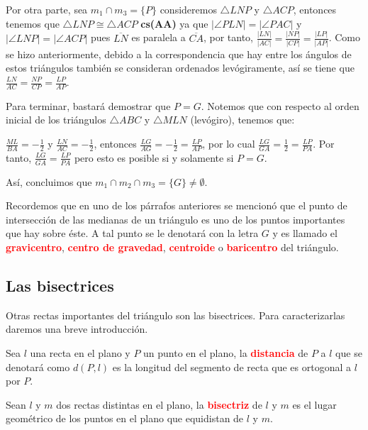 \begin{dem}
Por otra parte, sea $m_{1}\cap m_{3}=\{P\}$ consideremos $\triangle LNP$ y $\triangle ACP$, entonces tenemos que $\triangle LNP\cong\triangle ACP$ \textbf{cs(AA)} ya que $|\angle PLN|=|\angle PAC|$ y $|\angle LNP|=|\angle ACP|$ pues $\overline{LN}$ es paralela a $\overline{CA}$, por tanto, $\frac{|LN|}{|AC|}=\frac{|NP|}{|CP|}=\frac{|LP|}{|AP|}$. Como se hizo anteriormente, debido a la correspondencia que hay entre los ángulos de estos triángulos también se consideran ordenados levógiramente, así se tiene que $\frac{LN}{AC}=\frac{NP}{CP}=\frac{LP}{AP}$.

Para terminar, bastará demostrar que $P=G$. Notemos que con respecto al orden inicial de los triángulos $\triangle ABC$ y $\triangle MLN$ (levógiro), tenemos que:

$\frac{ML}{BA}=-\frac{1}{2}$ y $\frac{LN}{AC}=-\frac{1}{2}$, entonces $\frac{LG}{AG}=-\frac{1}{2}=\frac{LP}{AP}$, por lo cual $\frac{LG}{GA}=\frac{1}{2}=\frac{LP}{PA}$. Por tanto, $\frac{LG}{GA}=\frac{LP}{PA}$ pero esto es posible si y solamente si $P=G$.

Así, concluimos que $m_{1}\cap m_{2}\cap m_{3}=\{G\}\neq\emptyset.$
\end{dem}

Recordemos que en uno de los párrafos anteriores se mencionó que el punto de intersección de las medianas de un triángulo es uno de los puntos importantes que hay sobre éste. A tal punto se le denotará con la letra $G$ y es llamado el \textcolor{red}{\bf gravicentro}, \textcolor{red}{\bf centro de gravedad}, \textcolor{red}{\bf centroide} o \textcolor{red}{\bf baricentro} del triángulo.

\subsection{Las bisectrices}
Otras rectas importantes del triángulo son las bisectrices. Para caracterizarlas daremos una breve introducción. 

\begin{df}
Sea $l$ una recta en el plano y $P$ un punto en el plano, la \textcolor{red}{\bf distancia} de $P$ a $l$ que se denotará como $d(P,l)$ es la longitud del segmento de recta que es ortogonal a $l$ por $P$.
\end{df}

\begin{df}\label{db}
Sean $l$ y $m$ dos rectas distintas en el plano, la \textcolor{red}{\bf bisectriz} de $l$ y $m$ es el lugar geométrico de los puntos en el plano que equidistan de $l$ y $m$. 
\end{df}

